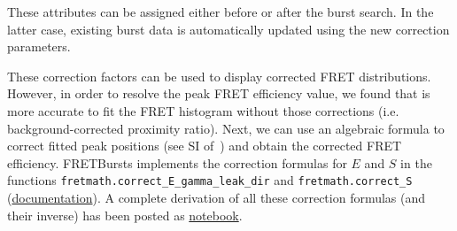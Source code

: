 These attributes can be assigned either before or after the burst search. In the
latter case, existing burst data is automatically updated using the new
correction parameters.

These correction factors can be used to display corrected FRET distributions.
However, in order to resolve the peak FRET efficiency value, we found that is more accurate to 
fit the FRET histogram without those corrections (i.e. background-corrected
proximity ratio). Next, we can use an algebraic formula to correct fitted peak
positions (see SI of~\cite{Lee_2005}) and obtain the corrected FRET efficiency.
FRETBursts implements the correction formulas for $E$ and $S$ in the functions
\verb|fretmath.correct_E_gamma_leak_dir| and \verb|fretmath.correct_S|
(\href{http://fretbursts.readthedocs.org/en/latest/fretmath.html}{documentation}). 
A complete derivation of all these correction formulas
(and their inverse) has been posted as \href{http://nbviewer.jupyter.org/github/tritemio/notebooks/blob/master/Derivation%20of%20FRET%20and%20S%20correction%20formulas.ipynb}{notebook}.

